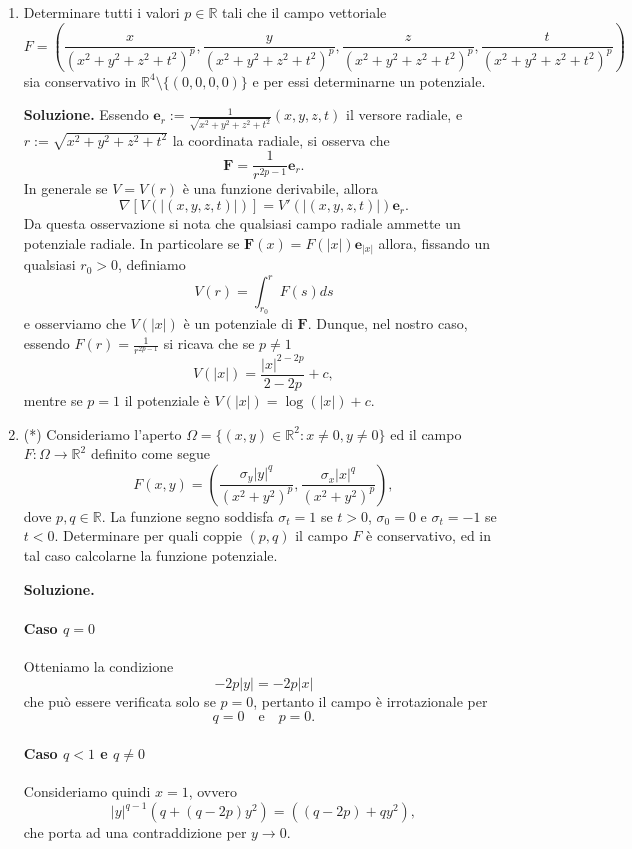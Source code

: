 \begin{enumerate}
	
	\item Determinare tutti i valori $p \in \mathbb{R}$ tali che il campo vettoriale
	\[
	F = \left(\frac{x}{(x^2 + y^2 + z^2 + t^2)^p}, \frac{y}{(x^2 + y^2 + z^2 + t^2)^p}, \frac{z}{(x^2 + y^2 + z^2 + t^2)^p}, \frac{t}{(x^2 + y^2 + z^2 + t^2)^p}\right)
	\]
	sia conservativo in $\mathbb{R}^4 \setminus \{(0,0,0,0)\}$ e per essi determinarne un potenziale.
	
	\textbf{Soluzione.}
		Essendo $\mathbf{e}_r := \frac{1}{\sqrt{x^2 + y^2 + z^2 + t^2}} (x,y,z,t)$ il versore radiale, e $r := \sqrt{x^2 + y^2 + z^2 + t^2}$ la coordinata radiale, si osserva che
		\[
		\mathbf{F} = \frac{1}{r^{2p - 1}} \mathbf{e}_r.
		\]
		In generale se $V = V(r)$ è una funzione derivabile, allora
		\[
		\nabla \left[V \left(|(x,y,z,t)|\right)\right] = V'(|(x,y,z,t)|) \mathbf{e}_r.
		\]
		Da questa osservazione si nota che qualsiasi campo radiale ammette un potenziale radiale. In particolare se $\mathbf{F}(x) = F(|x|)\mathbf{e}_{|x|}$ allora, fissando un qualsiasi $r_0 > 0$, definiamo
		\[
		V(r) = \int_{r_0}^r F(s) ds
		\]
		e osserviamo che $V(|x|)$ è un potenziale di $\mathbf{F}$. Dunque, nel nostro caso, essendo $F(r) = \frac{1}{r^{2p - 1}}$ si ricava che se $p \neq 1$
		\[
		V(|x|) = \frac{|x|^{2 - 2p}}{2 - 2p} + c,
		\]
		mentre se $p = 1$ il potenziale è $V(|x|) = \log(|x|) + c$.
	
	
	\item (*) Consideriamo l'aperto $\Omega = \{(x,y) \in \mathbb{R}^2 : x \neq 0, y \neq 0\}$ ed il campo $F: \Omega \to \mathbb{R}^2$ definito come segue
	\[
	F(x,y) = \left(\frac{\sigma_y |y|^q}{(x^2 + y^2)^p}, \frac{\sigma_x |x|^q}{(x^2 + y^2)^p}\right),
	\]
	dove $p,q \in \mathbb{R}$. La funzione segno soddisfa $\sigma_t = 1$ se $t > 0$, $\sigma_0 = 0$ e $\sigma_t = -1$ se $t < 0$. Determinare per quali coppie $(p,q)$ il campo $F$ è conservativo, ed in tal caso calcolarne la funzione potenziale.
	
	\textbf{Soluzione.}\\
		\paragraph{Caso $q = 0$}
		Otteniamo la condizione
		\[
		-2p|y| = -2p|x|
		\]
		che può essere verificata solo se $p = 0$, pertanto il campo è irrotazionale per
		\[
		q = 0 \quad \text{e} \quad p = 0.
		\]
		
		\paragraph{Caso $q < 1$ e $q \neq 0$}
		Consideriamo quindi $x = 1$, ovvero
		\[
		|y|^{q - 1} \left(q + (q - 2p)y^2\right) = \left((q - 2p) + q y^2\right),
		\]
		che porta ad una contraddizione per $y \to 0$.
		

\end{enumerate}
